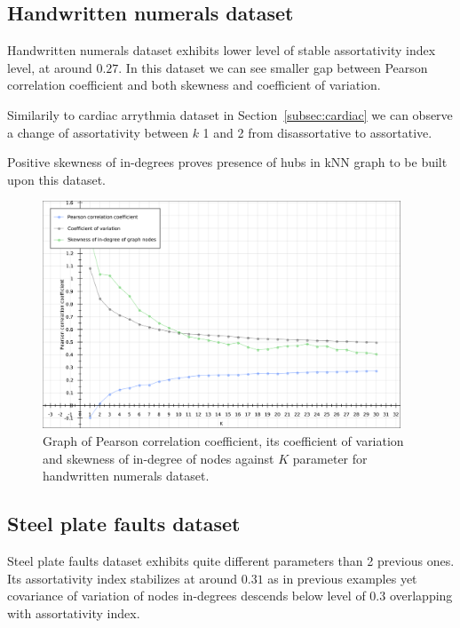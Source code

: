 \subsection{Handwritten numerals dataset}
Handwritten numerals dataset exhibits lower level of stable assortativity index level, at around $0.27$.
In this dataset we can see smaller gap between Pearson correlation coefficient and both skewness and coefficient of variation.

Similarily to cardiac arrythmia dataset in Section~\ref{subsec:cardiac} we can observe a change of assortativity between $k$ 1 and 2 from disassortative to assortative.

Positive skewness of in-degrees proves presence of hubs in kNN graph to be built upon this dataset.

\begin{figure}[h!]
  \centering
  \captionsetup{justification=centering}
    \includegraphics[width=0.95\textwidth]{images/mfeat_pearson.pdf}
  \caption{Graph of Pearson correlation coefficient, its coefficient of variation and skewness of in-degree of nodes against $K$ parameter for handwritten numerals dataset.}
  \label{fig:graph_mfeat_pearson}
\end{figure}


\clearpage
\subsection{Steel plate faults dataset}
Steel plate faults dataset exhibits quite different parameters than 2 previous ones.
Its assortativity index stabilizes at around $0.31$ as in previous examples yet covariance of variation of nodes in-degrees descends below level of $0.3$ overlapping with assortativity index.

